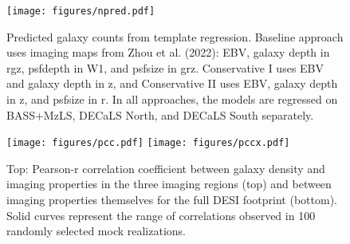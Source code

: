 \begin{figure}
    \centering
    \texttt{[image: figures/npred.pdf]}
    \caption{Predicted galaxy counts from template regression. Baseline approach uses imaging maps from Zhou et al. (2022): EBV, galaxy depth in rgz, psfdepth in W1, and psfsize in grz. Conservative I uses EBV and galaxy depth in z, and Conservative II uses EBV, galaxy depth in z, and psfsize in r. In all approaches, the models are regressed on BASS+MzLS, DECaLS North, and DECaLS South separately.}
    \label{fig:npred}
\end{figure}

\begin{figure}
    \texttt{[image: figures/pcc.pdf]} 
    \texttt{[image: figures/pccx.pdf]}     
    \caption{Top: Pearson-r correlation coefficient between galaxy density and imaging properties in the three imaging regions (top) and between imaging properties themselves for the full DESI footprint (bottom). Solid curves represent the range of correlations observed in 100 randomly selected mock realizations.}
    \label{fig:pcc}
\end{figure}
